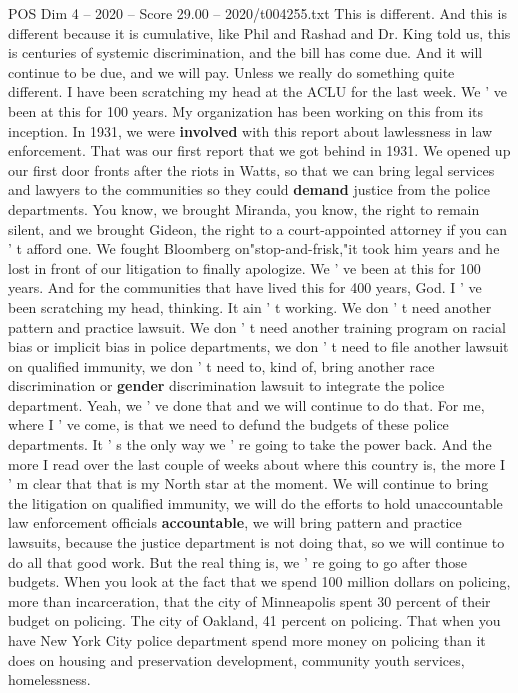 \begin{textsample}{POS Dim 4 – 2020 – Score 29.00 – 2020/t004255.txt}
This is different.
And this is different because it is cumulative, like Phil and Rashad and Dr.
King told us, this is centuries of systemic discrimination, and the bill has come due.
And it will continue to be due, and we will pay.
Unless we really do something quite different.
I have been scratching my head at the ACLU for the last week.
We ' ve been at this for 100 years.
My organization has been working on this from its inception.
In 1931, we were \textbf{involved} with this report about lawlessness in law enforcement.
That was our first report that we got behind in 1931.
We opened up our first door fronts after the riots in Watts, so that we can bring legal services and lawyers to the communities so they could \textbf{demand} justice from the police departments.
You know, we brought Miranda, you know, the right to remain silent, and we brought Gideon, the right to a court-appointed attorney if you can ' t afford one.
We fought Bloomberg on"stop-and-frisk,"it took him years and he lost in front of our litigation to finally apologize.
We ' ve been at this for 100 years.
And for the communities that have lived this for 400 years, God.
I ' ve been scratching my head, thinking.
It ain ' t working.
We don ' t need another pattern and practice lawsuit.
We don ' t need another training program on racial bias or implicit bias in police departments, we don ' t need to file another lawsuit on qualified immunity, we don ' t need to, kind of, bring another race discrimination or \textbf{gender} discrimination lawsuit to integrate the police department.
Yeah, we ' ve done that and we will continue to do that.
For me, where I ' ve come, is that we need to defund the budgets of these police departments.
It ' s the only way we ' re going to take the power back.
And the more I read over the last couple of weeks about where this country is, the more I ' m clear that that is my North star at the moment.
We will continue to bring the litigation on qualified immunity, we will do the efforts to hold unaccountable law enforcement officials \textbf{accountable}, we will bring pattern and practice lawsuits, because the justice department is not doing that, so we will continue to do all that good work.
But the real thing is, we ' re going to go after those budgets.
When you look at the fact that we spend 100 million dollars on policing, more than incarceration, that the city of Minneapolis spent 30 percent of their budget on policing.
The city of Oakland, 41 percent on policing.
That when you have New York City police department spend more money on policing than it does on housing and preservation development, community youth services, homelessness.

\end{textsample}
